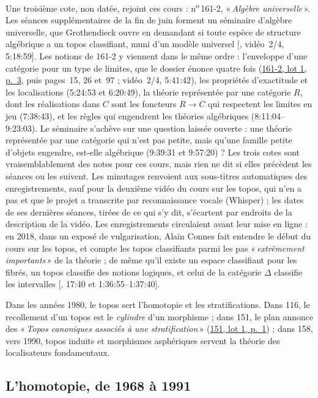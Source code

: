 \documentclass[11pt]{amsart}
\makeatletter
\newcommand{\ts}[1]{\foreignlanguage{english}{#1}}
\newcommand{\q}[1]{«\,\textit{#1}\,»}
\newcommand{\cote}[1]{\mbox{n\textsuperscript{o}\,#1}}
\def\RHM@first#1--#2\@nil{#1}
\DeclareRobustCommand{\lot}[3]{\begingroup\edef\RHM@pdfpage{\the\numexpr\RHM@first#3--\@nil+1\relax}\href{https://grothendieck.umontpellier.fr/#1.pdf\#page=\RHM@pdfpage}{#1, lot #2, p.~#3}\endgroup}
\newcommand{\lot}[3]{\href{https://grothendieck.commutator.io/\##1/#2/p#3}{#1, lot #2, p.~#3}}
\makeatother
\begin{document}
Une troisième cote, non datée, rejoint ces cours : \cote{161-2}, \q{Algèbre universelle}. Les séances supplémentaires de la fin de juin forment un séminaire d'algèbre universelle, que Grothendieck ouvre en demandant si toute espèce de structure algébrique a un topos classifiant, muni d'un modèle universel [\citealp{buffalo1973topos}, vidéo~2/4, \ts{5:18:59}]. Les notions de 161-2 y viennent dans le même ordre : l'enveloppe d'une catégorie pour un type de limites, que le dossier énonce quatre fois (\lot{161-2}{1}{3}, puis pages~15, 26 et~97 ; vidéo~2/4, \ts{5:41:42}), les propriétés d'exactitude et les localisations (\ts{5:24:53} et \ts{6:20:49}), la théorie représentée par une catégorie $R$, dont les réalisations dans $C$ sont les foncteurs $R \to C$ qui respectent les limites en jeu (\ts{7:38:43}), et les règles qui engendrent les théories algébriques (\ts{8:11:04--9:23:03}). Le séminaire s'achève sur une question laissée ouverte : une théorie représentée par une catégorie qui n'est pas petite, mais qu'une famille petite d'objets engendre, est-elle algébrique (\ts{9:39:31} et \ts{9:57:20}) ? Les trois cotes sont vraisemblablement des notes pour ces cours, mais rien ne dit si elles précèdent les séances ou les suivent. Les minutages renvoient aux sous-titres automatiques des enregistrements, sauf pour la deuxième vidéo du cours sur les topos, qui n'en a pas et que le projet a transcrite par reconnaissance vocale (Whisper) ; les dates de ses dernières séances, tirées de ce qui s'y dit, s'écartent par endroits de la description de la vidéo. Les enregistrements circulaient avant leur mise en ligne : en 2018, dans un exposé de vulgarisation, Alain Connes fait entendre le début du cours sur les topos, et compte les topos classifiants parmi les pas \q{extrêmement importants} de la théorie ; de même qu'il existe un espace classifiant pour les fibrés, un topos classifie des notions logiques, et celui de la catégorie $\Delta$ classifie les intervalles [\citealp{connes2018}, \ts{17:40} et \ts{1:36:55--1:37:40}].

Dans les années 1980, le topos sert l'homotopie et les stratifications. Dans 116, le recollement d'un topos est le \emph{cylindre} d'un morphisme ; dans 151, le plan annonce des \q{Topos canoniques associés à une stratification} (\lot{151}{1}{1}) ; dans 158, vers 1990, topos induits et morphismes asphériques servent la théorie des localisateurs fondamentaux.

\subsection{L'homotopie, de 1968 à 1991}\label{sub:homotopie}
\end{document}
